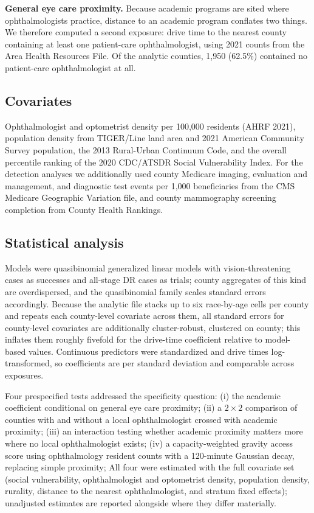 \documentclass[11pt]{article}
\begin{document}
\textbf{General eye care proximity.} Because academic programs are sited where
ophthalmologists practice, distance to an academic program conflates two things.
We therefore computed a second exposure: drive time to the nearest county
containing at least one patient-care ophthalmologist, using 2021 counts from the
Area Health Resources File.\citep{ahrf} Of the analytic counties, 1,950 (62.5\%)
contained no patient-care ophthalmologist at all.

\subsection{Covariates}

Ophthalmologist and optometrist density per 100,000 residents (AHRF 2021),
population density from TIGER/Line land area and 2021 American Community Survey
population, the 2013 Rural-Urban Continuum Code, and the overall percentile
ranking of the 2020 CDC/ATSDR Social Vulnerability Index.\citep{svi} For the
detection analyses we additionally used county Medicare imaging, evaluation and
management, and diagnostic test events per 1,000 beneficiaries from the CMS
Medicare Geographic Variation file,\citep{cmsgeo} and county mammography
screening completion from County Health Rankings.\citep{chr}

\subsection{Statistical analysis}

Models were quasibinomial generalized linear models with vision-threatening
cases as successes and all-stage DR cases as trials; county aggregates of this
kind are overdispersed, and the quasibinomial family scales standard errors
accordingly. Because the analytic file stacks up to six race-by-age cells per
county and repeats each county-level covariate across them, all standard errors
for county-level covariates are additionally cluster-robust, clustered on
county; this inflates them roughly fivefold for the drive-time coefficient
relative to model-based values. Continuous predictors were standardized and drive times
log-transformed, so coefficients are per standard deviation and comparable
across exposures.

Four prespecified tests addressed the specificity question: (i) the academic
coefficient conditional on general eye care proximity; (ii) a $2\times2$
comparison of counties with and without a local ophthalmologist crossed with
academic proximity; (iii) an interaction testing whether academic proximity
matters more where no local ophthalmologist exists; (iv) a capacity-weighted
gravity access score using ophthalmology resident counts with a 120-minute
Gaussian decay, replacing simple proximity; All four
were estimated with the full covariate set (social vulnerability,
ophthalmologist and optometrist density, population density, rurality, distance
to the nearest ophthalmologist, and stratum fixed effects); unadjusted
estimates are reported alongside where they differ materially.
\end{document}
